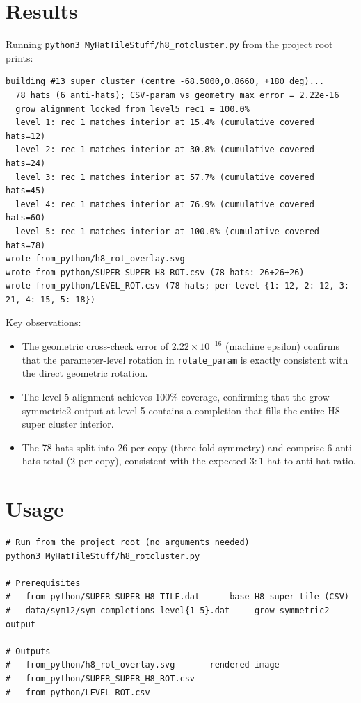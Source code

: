 \documentclass[10pt,a4paper]{article}
\let\polysection\section
\renewcommand\section{\needspace{0.16\textheight}\polysection}
\newcommand{\code}[1]{\texttt{\small #1}}
\begin{document}
\section{Results}

Running \code{python3 MyHatTileStuff/h8\_rotcluster.py} from the project root
prints:

\begin{verbatim}
building #13 super cluster (centre -68.5000,0.8660, +180 deg)...
  78 hats (6 anti-hats); CSV-param vs geometry max error = 2.22e-16
  grow alignment locked from level5 rec1 = 100.0%
  level 1: rec 1 matches interior at 15.4% (cumulative covered hats=12)
  level 2: rec 1 matches interior at 30.8% (cumulative covered hats=24)
  level 3: rec 1 matches interior at 57.7% (cumulative covered hats=45)
  level 4: rec 1 matches interior at 76.9% (cumulative covered hats=60)
  level 5: rec 1 matches interior at 100.0% (cumulative covered hats=78)
wrote from_python/h8_rot_overlay.svg
wrote from_python/SUPER_SUPER_H8_ROT.csv (78 hats: 26+26+26)
wrote from_python/LEVEL_ROT.csv (78 hats; per-level {1: 12, 2: 12, 3: 21, 4: 15, 5: 18})
\end{verbatim}

\medskip
Key observations:
\begin{itemize}
  \item The geometric cross-check error of $2.22\times 10^{-16}$ (machine
    epsilon) confirms that the parameter-level rotation in \code{rotate\_param}
    is exactly consistent with the direct geometric rotation.
  \item The level-5 alignment achieves 100\% coverage, confirming that the
    grow-symmetric2 output at level 5 contains a completion that fills the
    entire H8 super cluster interior.
  \item The 78 hats split into 26 per copy (three-fold symmetry) and comprise
    6 anti-hats total ($2$ per copy), consistent with the expected $3:1$
    hat-to-anti-hat ratio.
\end{itemize}

\section{Usage}

\begin{verbatim}
# Run from the project root (no arguments needed)
python3 MyHatTileStuff/h8_rotcluster.py

# Prerequisites
#   from_python/SUPER_SUPER_H8_TILE.dat   -- base H8 super tile (CSV)
#   data/sym12/sym_completions_level{1-5}.dat  -- grow_symmetric2 output

# Outputs
#   from_python/h8_rot_overlay.svg    -- rendered image
#   from_python/SUPER_SUPER_H8_ROT.csv
#   from_python/LEVEL_ROT.csv
\end{verbatim}
\end{document}
